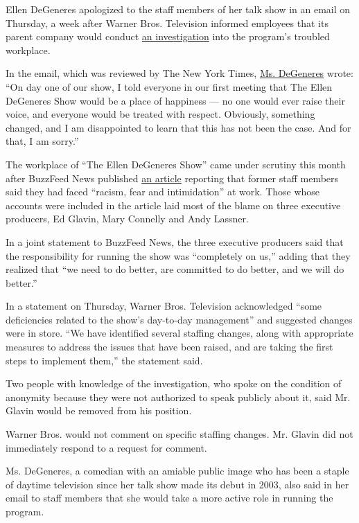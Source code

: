 Ellen DeGeneres apologized to the staff members of her talk show in an
email on Thursday, a week after Warner Bros. Television informed
employees that its parent company would conduct
\href{https://www.nytimes.com/2020/07/27/business/media/ellen-degeneres-show-investigation.html}{an
investigation} into the program's troubled workplace.

In the email, which was reviewed by The New York Times,
\href{https://www.nytimes.com/2018/12/12/arts/television/ellen-degeneres.html}{Ms.
DeGeneres} wrote: ``On day one of our show, I told everyone in our first
meeting that The Ellen DeGeneres Show would be a place of happiness ---
no one would ever raise their voice, and everyone would be treated with
respect. Obviously, something changed, and I am disappointed to learn
that this has not been the case. And for that, I am sorry.''

The workplace of ``The Ellen DeGeneres Show'' came under scrutiny this
month after BuzzFeed News published
\href{https://www.buzzfeednews.com/article/krystieyandoli/ellen-employees-allege-toxic-workplace-culture}{an
article} reporting that former staff members said they had faced
``racism, fear and intimidation'' at work. Those whose accounts were
included in the article laid most of the blame on three executive
producers, Ed Glavin, Mary Connelly and Andy Lassner.

In a joint statement to BuzzFeed News, the three executive producers
said that the responsibility for running the show was ``completely on
us,'' adding that they realized that ``we need to do better, are
committed to do better, and we will do better.''

In a statement on Thursday, Warner Bros. Television acknowledged ``some
deficiencies related to the show's day-to-day management'' and suggested
changes were in store. ``We have identified several staffing changes,
along with appropriate measures to address the issues that have been
raised, and are taking the first steps to implement them,'' the
statement said.

Two people with knowledge of the investigation, who spoke on the
condition of anonymity because they were not authorized to speak
publicly about it, said Mr. Glavin would be removed from his position.

Warner Bros. would not comment on specific staffing changes. Mr. Glavin
did not immediately respond to a request for comment.

Ms. DeGeneres, a comedian with an amiable public image who has been a
staple of daytime television since her talk show made its debut in 2003,
also said in her email to staff members that she would take a more
active role in running the program.

